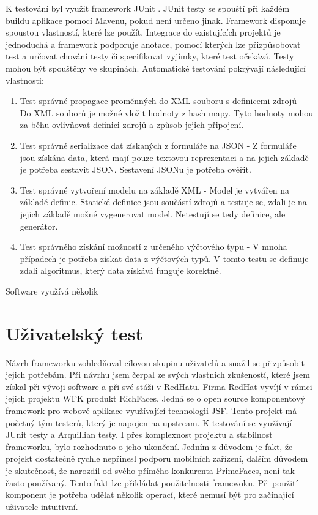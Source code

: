 K testování byl využit framework JUnit \cite{junit}. JUnit testy se spouští při každém buildu aplikace pomocí Mavenu, pokud není určeno jinak. Framework disponuje spoustou vlastností, které lze použít. Integrace do existujících projektů je jednoduchá a framework podporuje anotace, pomocí kterých lze přizpůsobovat test a určovat chování testy či specifikovat vyjímky, které test očekává. Testy mohou být spouštěny ve skupinách. Automatické testování pokrývají následující vlastnosti:
\begin{enumerate}
\item Test správné propagace proměnných do XML souboru s definicemi zdrojů - Do XML souborů je možné vložit hodnoty z hash mapy. Tyto hodnoty mohou za běhu ovlivňovat definici zdrojů a způsob jejich připojení. 
\item Test správné serializace dat získaných z formuláře na JSON - Z formuláře jsou získána data, která mají pouze textovou reprezentaci a na jejich základě je potřeba sestavit JSON. Sestavení JSONu je potřeba ověřit.
\item Test správné vytvoření modelu na základě XML - Model je vytvářen na základě definic. Statické definice jsou součástí zdrojů a testuje se, zdali je na jejich základě možné vygenerovat model. Netestují se tedy definice, ale generátor.
\item Test správného získání možností z určeného výčtového typu - V mnoha případech je potřeba získat data z výčtových typů. V tomto testu se definuje zdali algoritmus, který data získává funguje korektně.
\end{enumerate}

Software využívá několik
\section{Uživatelský test}
Návrh frameworku zohledňoval cílovou skupinu uživatelů a snažil se přizpůsobit jejich potřebám. Při návrhu jsem čerpal ze svých vlastních zkušeností, které jsem získal při vývoji software a při své stáži v RedHatu. Firma RedHat vyvíjí v rámci jejich projektu WFK produkt RichFaces. Jedná se o open source komponentový framework pro webové aplikace využívající technologii JSF. Tento projekt má početný tým testerů, který je napojen na upstream. K testování se využívají JUnit testy a Arquillian testy. I přes komplexnost projektu a stabilnost frameworku, bylo rozhodnuto o jeho ukončení. Jedním z důvodem je fakt, že projekt dostatečně rychle nepřinesl podporu mobilních zařízení, dalším důvodem je skutečnost, že narozdíl od svého přímého konkurenta PrimeFaces, není tak často používaný. Tento fakt lze přikládat použitelnosti framewoku. Při použití komponent je potřeba udělat několik operací, které nemusí být pro začínající uživatele intuitivní. 

